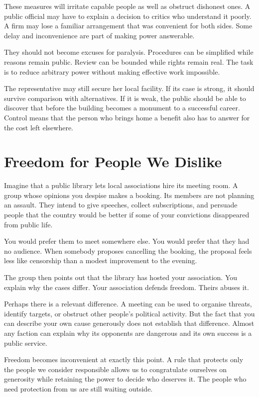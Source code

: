 \documentclass[12pt,a4paper]{book}
\begin{document}
These measures will irritate capable people as well as obstruct dishonest ones. A public official may have to explain a decision to critics who understand it poorly. A firm may lose a familiar arrangement that was convenient for both sides. Some delay and inconvenience are part of making power answerable.

They should not become excuses for paralysis. Procedures can be simplified while reasons remain public. Review can be bounded while rights remain real. The task is to reduce arbitrary power without making effective work impossible.

The representative may still secure her local facility. If its case is strong, it should survive comparison with alternatives. If it is weak, the public should be able to discover that before the building becomes a monument to a successful career. Control means that the person who brings home a benefit also has to answer for the cost left elsewhere.

\chapter{Freedom for People We Dislike}

Imagine that a public library lets local associations hire its meeting room. A group whose opinions you despise makes a booking. Its members are not planning an assault. They intend to give speeches, collect subscriptions, and persuade people that the country would be better if some of your convictions disappeared from public life.

You would prefer them to meet somewhere else. You would prefer that they had no audience. When somebody proposes cancelling the booking, the proposal feels less like censorship than a modest improvement to the evening.

The group then points out that the library has hosted your association. You explain why the cases differ. Your association defends freedom. Theirs abuses it.

Perhaps there is a relevant difference. A meeting can be used to organise threats, identify targets, or obstruct other people's political activity. But the fact that you can describe your own cause generously does not establish that difference. Almost any faction can explain why its opponents are dangerous and its own success is a public service.

Freedom becomes inconvenient at exactly this point. A rule that protects only the people we consider responsible allows us to congratulate ourselves on generosity while retaining the power to decide who deserves it. The people who need protection from us are still waiting outside.
\end{document}
